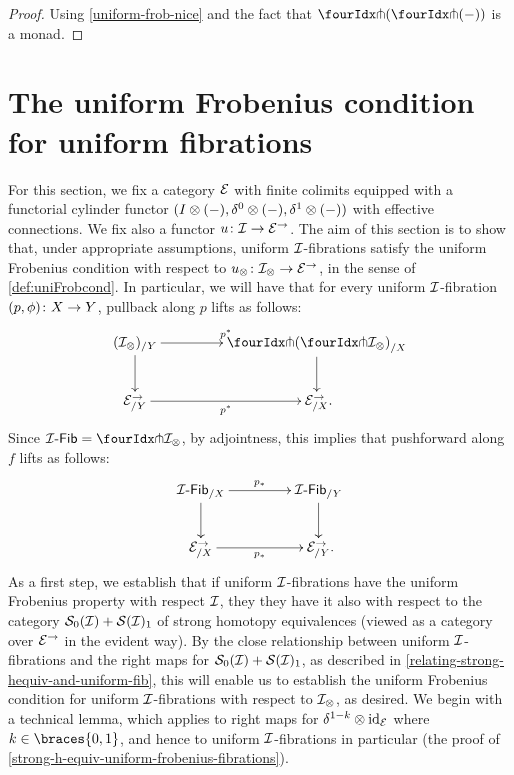 \documentclass[reqno,10pt,a4paper,oneside,draft]{amsart}
\begin{document}
\begin{proof}
Using \cref{uniform-frob-nice} and the fact that $\liftl{(\liftr{(-)})}$ is a monad.
\end{proof}


\section{The uniform Frobenius condition for uniform fibrations}
\label{sec:frocuf}

For this section, we fix a category $\catE$ with finite colimits equipped with a functorial cylinder functor $(\interval \otimes (-), \lcyl \otimes (-), \rcyl \otimes (-))$ with effective connections.
We fix also a functor $u \co \cal{I} \to \catE^\to$.
The aim of this section is to show that, under appropriate assumptions, uniform $\cal{I}$-fibrations satisfy the uniform Frobenius condition with respect to $u_\otimes \co \cal{I}_\otimes \to \cal{E}^\to$, in the sense of \cref{def:uniFrobcond}.
In particular, we will have that for every uniform $\cal{I}$-fibration $(p, \phi) \co X \to Y$, pullback along $p$ lifts as follows:
\[
\xymatrix@C+2em{
  (\cal{I}_\otimes)_{/Y}
  \ar[r]^{p^*}
  \ar[d]
&
  \liftl{(\liftr{\cal{I}_\otimes})}_{/X}
  \ar[d]
\\
  \cal{E}^\to_{/Y}
  \ar[r]_{p^*}
&
  \cal{E}^\to_{/X}
\rlap{.}}
\]
Since $\Fib{\cal{I}}  = \liftr{\cal{I}_\otimes}$, by adjointness, this implies that pushforward along $f$ lifts as follows:
\[
\xymatrix@C+2em{
  \Fib{\cal{I}}_{/X}
  \ar[r]^{p_*}
  \ar[d]
&
  \Fib{\cal{I}}_{/Y}
  \ar[d]
\\
  \cal{E}^\to_{/X}
  \ar[r]_{p_*}
&
  \cal{E}^\to_{/Y}
\rlap{.}}
\]
As a first step, we establish that if uniform $\cal{I}$-fibrations have the uniform Frobenius property with respect $\cal{I}$, they they have it also with respect to the category $\cal{S}_0(\cal{I}) + \cal{S}(\cal{I})_1$ of strong homotopy equivalences (viewed as a category over $\cal{E}^\to$ in the evident way).
By the close relationship between uniform $\cal{I}$-fibrations and the right maps for $\cal{S}_0(\cal{I}) + \cal{S}(\cal{I})_1$, as described in \cref{relating-strong-hequiv-and-uniform-fib}, this will enable us to establish the uniform Frobenius condition for uniform $\cal{I}$-fibrations with respect to $\cal{I}_\otimes$, as desired.
We begin with a technical lemma, which applies to right maps for $\kcylinv \otimes \id_{\calE}$ where $k \in \braces{0, 1}$, and hence to uniform $\cal{I}$-fibrations in particular (\cf the proof of \cref{strong-h-equiv-uniform-frobenius-fibrations}).
\end{document}
